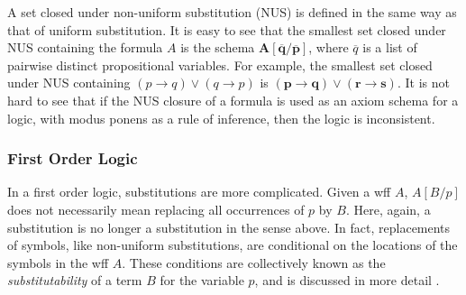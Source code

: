 \documentclass[12pt]{article}
\begin{document}
A set closed under non-uniform substitution (NUS) is defined in the same way as that of uniform substitution.  It is easy to see that the smallest set closed under NUS containing the formula $A$ is the schema $\mathbf{A[\overline{q}/\overline{p}]}$, where $\overline{q}$ is a list of pairwise distinct propositional variables.  For example, the smallest set closed under NUS containing $(p\to q)\lor (q\to p)$ is $\mathbf{(p\to q)\lor(r\to s)}$.  It is not hard to see that if the NUS closure of a formula is used as an axiom schema for a logic, with modus ponens as a rule of inference, then the logic is inconsistent.

\subsubsection*{First Order Logic}
In a first order logic, substitutions are more complicated.  Given a wff $A$, $A[B/p]$ does not necessarily mean replacing all occurrences of $p$ by $B$.  Here, again, a substitution is no longer a substitution in the sense above.  In fact, replacements of symbols, like non-uniform substitutions, are conditional on the locations of the symbols in the wff $A$.  These conditions are collectively known as the \emph{substitutability} of a term $B$ for the variable $p$, and is discussed in more detail .

\end{document}
